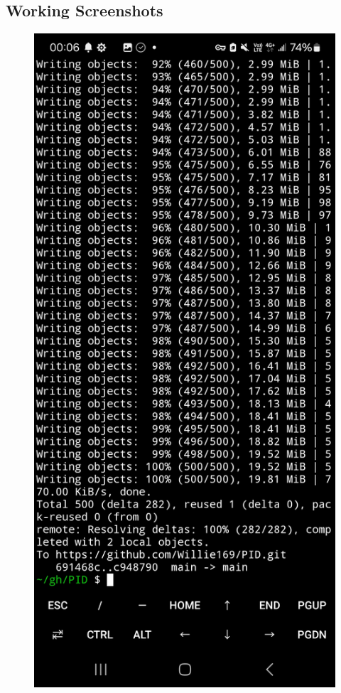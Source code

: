 \documentclass[a4paper,12pt]{article}
\begin{document}
\subsection{Working Screenshots}
\begin{center}\begin{figure}[H]\centering
\hfill
\begin{minipage}[t]{0.45\textwidth}
\centering
\includegraphics[width=\textwidth]{./working_screenshots/1.jpg}

\end{minipage}
\end{figure}
\end{center}
\end{document}
